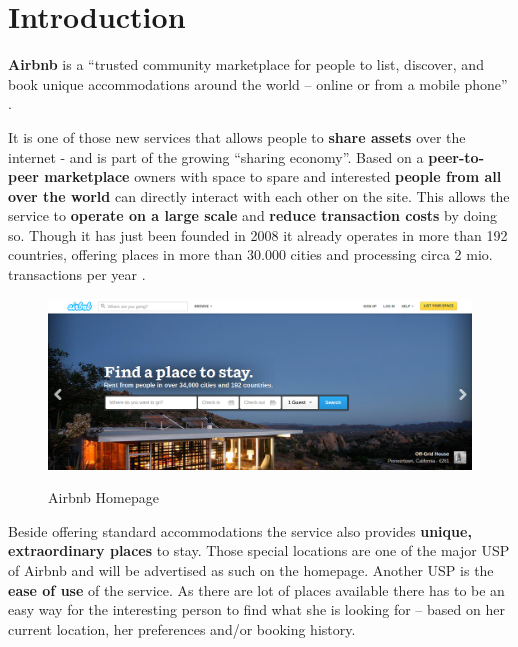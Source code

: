 \section{Introduction} %
\label{sec:introduction}
{\bf Airbnb} is a ``trusted community marketplace for people to list, discover, and book unique accommodations around the world -- online or from a mobile phone'' \citep{Airbnb14a}.
\vspace{0.2cm}

It is one of those new services that allows people to {\bf share assets} over the internet - and is part of the growing ``sharing economy''. Based on a {\bf peer-to-peer marketplace} owners with space to spare and interested {\bf people from all over the world} can directly interact with each other on the site. This allows the service to {\bf operate on a large scale} and {\bf reduce transaction costs} by doing so. Though it has just been founded in 2008 it already operates in more than 192 countries, offering places in more than 30.000 cities and processing circa 2 mio. transactions per year \citep{Economist13}.

\vspace{0.5cm}
\begin{figure}[!ht]
    \center
        \includegraphics[width=1.0\textwidth]{assets/Airbnb_Homepage.png}
    \caption{Airbnb Homepage}
    \citep{Airbnb14b}
    \label{fig:Airbnb_homepage}
\end{figure}

Beside offering standard accommodations the service also provides {\bf unique, extraordinary places} to stay. Those special locations are one of the major USP of Airbnb and will be advertised as such on the homepage. Another USP is the {\bf  ease of use} of the service. As there are lot of places available there has to be an easy way for the interesting person to find what she is looking for -- based on her current location, her preferences and/or booking history.
\vspace{0.2cm}

